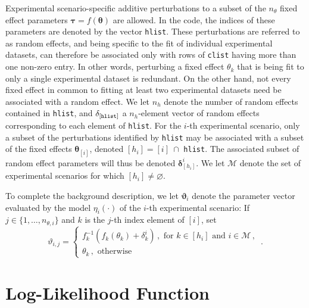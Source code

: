 \documentclass[11pt, oneside]{article}   	%
\begin{document}
\vspace{5mm}

\noindent
Experimental scenario-specific additive perturbations to a subset of the $n_\theta$ fixed effect parameters $\mathbf{\tau}=f(\mathbf{\theta})$ are allowed.  In the code, the indices of these parameters are denoted by the vector {\tt hlist}.  These perturbations are referred to as random effects, and being specific to the fit of individual experimental datasets, can therefore be associated only with rows of {\tt clist} having more than one non-zero entry.  In other words, perturbing a fixed effect $\theta_k$ that is being fit to only a single experimental dataset is redundant.  On the other hand, not every fixed effect in common to fitting at least two experimental datasets need be associated with a random effect.  We let $n_h$ denote the number of random effects contained in {\tt hlist}, and $\mathbf{\delta}_{[\mbox{{\scriptsize {\tt hlist}}}]}$ a $n_h$-element vector of random effects corresponding to each element of {\tt hlist}.  For the $i$-th experimental scenario, only a subset of the perturbations identified by {\tt hlist} may be associated with a subset of the fixed effects $\mathbf{\theta}_{[i]}$, denoted $[h_i] = [i]~\cap$ {\tt hlist}.  The associated subset of random effect parameters will thus be denoted $\mathbf{\delta}_{[h_i]}^i$.  We let $\mathcal{M}$ denote the set of experimental scenarios for which $[h_i] \ne \varnothing$.

\vspace{5mm}

\noindent
To complete the background description, we let $\mathbf{\vartheta}_i$ denote the parameter vector evaluated by the model $\eta_i (\cdot)$ of the $i$-th experimental scenario:  If $j \in \{ 1, \ldots, n_{\theta,i} \}$ and $k$ is the $j$-th index element of $[i]$, set 
\[
\vartheta_{i,j} = \left\{ \begin{array}{l}
f_k^{-1}(f_k(\theta_k) + \delta_k^i) \,, \mbox{ for } k \in [h_i] \mbox{ and } i \in \mathcal{M} \,, \\[1ex]
\theta_k \,, \mbox{ otherwise}
\end{array} \right. \,.
\]

\section{Log-Likelihood Function}
\end{document}
